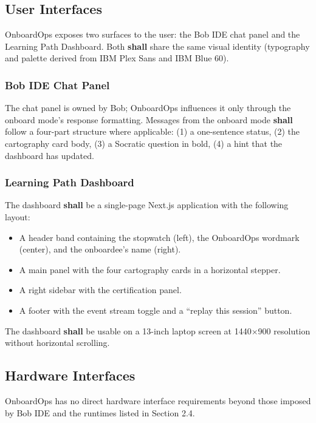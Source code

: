 \documentclass[11pt,letterpaper]{article}
\newcommand{\shall}{\textbf{shall}}
\begin{document}
\subsection{User Interfaces}

OnboardOps exposes two surfaces to the user: the Bob IDE chat panel and the Learning Path Dashboard. Both \shall{} share the same visual identity (typography and palette derived from IBM Plex Sans and IBM Blue 60).

\subsubsection*{Bob IDE Chat Panel}

The chat panel is owned by Bob; OnboardOps influences it only through the onboard mode's response formatting. Messages from the onboard mode \shall{} follow a four-part structure where applicable: (1) a one-sentence status, (2) the cartography card body, (3) a Socratic question in bold, (4) a hint that the dashboard has updated.

\subsubsection*{Learning Path Dashboard}

The dashboard \shall{} be a single-page Next.js application with the following layout:

\begin{itemize}
  \item A header band containing the stopwatch (left), the OnboardOps wordmark (center), and the onboardee's name (right).
  \item A main panel with the four cartography cards in a horizontal stepper.
  \item A right sidebar with the certification panel.
  \item A footer with the event stream toggle and a ``replay this session'' button.
\end{itemize}

The dashboard \shall{} be usable on a 13-inch laptop screen at 1440$\times$900 resolution without horizontal scrolling.

\subsection{Hardware Interfaces}

OnboardOps has no direct hardware interface requirements beyond those imposed by Bob IDE and the runtimes listed in Section 2.4.
\end{document}
